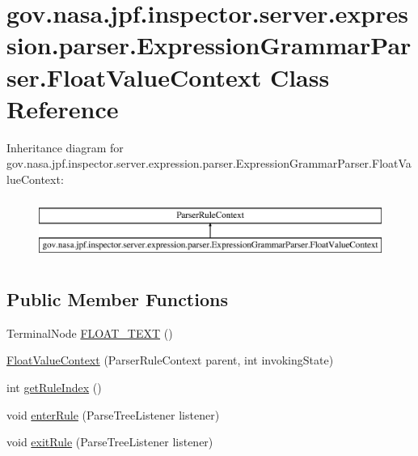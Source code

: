 \hypertarget{classgov_1_1nasa_1_1jpf_1_1inspector_1_1server_1_1expression_1_1parser_1_1_expression_grammar_parser_1_1_float_value_context}{}\section{gov.\+nasa.\+jpf.\+inspector.\+server.\+expression.\+parser.\+Expression\+Grammar\+Parser.\+Float\+Value\+Context Class Reference}
\label{classgov_1_1nasa_1_1jpf_1_1inspector_1_1server_1_1expression_1_1parser_1_1_expression_grammar_parser_1_1_float_value_context}
Inheritance diagram for gov.\+nasa.\+jpf.\+inspector.\+server.\+expression.\+parser.\+Expression\+Grammar\+Parser.\+Float\+Value\+Context\+:\begin{figure}[H]
\begin{center}
\leavevmode
\includegraphics[height=2.000000cm]{classgov_1_1nasa_1_1jpf_1_1inspector_1_1server_1_1expression_1_1parser_1_1_expression_grammar_parser_1_1_float_value_context}
\end{center}
\end{figure}
\subsection*{Public Member Functions}
\begin{DoxyCompactItemize}
\item 
Terminal\+Node \hyperlink{classgov_1_1nasa_1_1jpf_1_1inspector_1_1server_1_1expression_1_1parser_1_1_expression_grammar_parser_1_1_float_value_context_ae3436b8670b8efab6747e987e43cd4a7}{F\+L\+O\+A\+T\+\_\+\+T\+E\+XT} ()
\item 
\hyperlink{classgov_1_1nasa_1_1jpf_1_1inspector_1_1server_1_1expression_1_1parser_1_1_expression_grammar_parser_1_1_float_value_context_af881c2a491ba2e1a6f70aaba8f952f98}{Float\+Value\+Context} (Parser\+Rule\+Context parent, int invoking\+State)
\item 
int \hyperlink{classgov_1_1nasa_1_1jpf_1_1inspector_1_1server_1_1expression_1_1parser_1_1_expression_grammar_parser_1_1_float_value_context_aee5613b5beaf9da600e21a23753d0f44}{get\+Rule\+Index} ()
\item 
void \hyperlink{classgov_1_1nasa_1_1jpf_1_1inspector_1_1server_1_1expression_1_1parser_1_1_expression_grammar_parser_1_1_float_value_context_a581464d12d1cf98656de6e8c4a041896}{enter\+Rule} (Parse\+Tree\+Listener listener)
\item 
void \hyperlink{classgov_1_1nasa_1_1jpf_1_1inspector_1_1server_1_1expression_1_1parser_1_1_expression_grammar_parser_1_1_float_value_context_af77eb37adf22c4cfce7b6069b8bb528a}{exit\+Rule} (Parse\+Tree\+Listener listener)
\end{DoxyCompactItemize}
